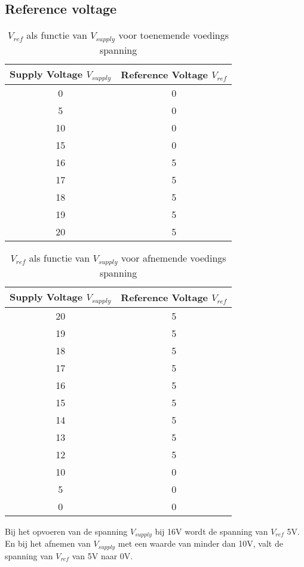\subsection{Reference voltage}

\begin{table}[h!]
\centering
\begin{tabular}{|c|c|}
\hline
\textbf{Supply Voltage \(V_{supply}\)} & \textbf{Reference Voltage \(V_{ref}\)} \\ \hline
0 & 0 \\ \hline
5 & 0 \\ \hline
10 & 0 \\ \hline
15 & 0 \\ \hline
16 & 5 \\ \hline
17 & 5 \\ \hline
18 & 5 \\ \hline
19 & 5 \\ \hline
20 & 5 \\ \hline
\end{tabular}
\caption{\(V_{ref}\) als functie van \(V_{supply}\) voor toenemende voedings spanning}
\label{tab:toenemende_spanning_uc3842}
\end{table}

\begin{table}[h!]
\centering
\begin{tabular}{|c|c|}
\hline
\textbf{Supply Voltage \(V_{supply}\)} & \textbf{Reference Voltage \(V_{ref}\)} \\ \hline
20 & 5 \\ \hline
19 & 5 \\ \hline
18 & 5 \\ \hline
17 & 5 \\ \hline
16 & 5 \\ \hline
15 & 5 \\ \hline
14 & 5 \\ \hline
13 & 5 \\ \hline
12 & 5 \\ \hline
10 & 0 \\ \hline
5 & 0 \\ \hline
0 & 0 \\ \hline
\end{tabular}
\caption{\(V_{ref}\) als functie van \(V_{supply}\) voor afnemende voedings spanning}
\label{tab:afnemende_spanning_uc3842}
\end{table}

Bij het opvoeren van de spanning \(V_{supply}\) bij 16V wordt de spanning van \(V_{ref}\) 5V. En bij het afnemen van \(V_{supply}\) met een waarde van minder dan 10V, valt de spanning van \(V_{ref}\) van 5V naar 0V.

